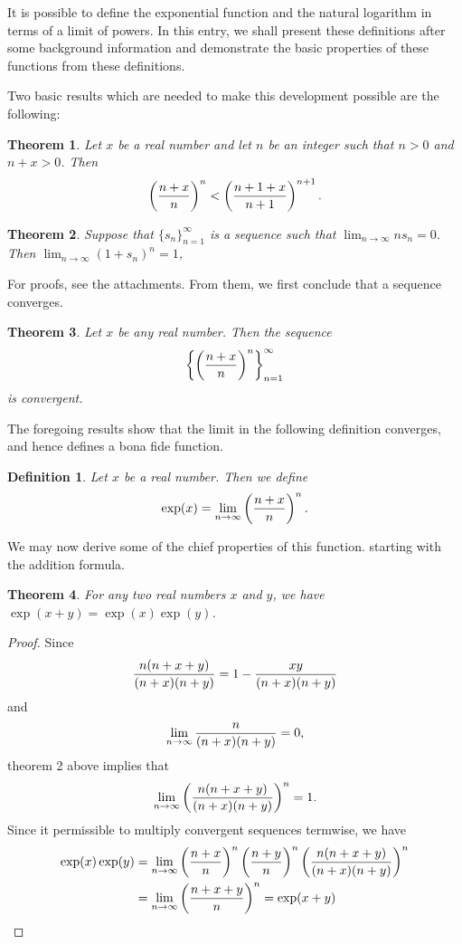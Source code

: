 \documentclass[12pt]{article}
\newtheorem{dfn}{Definition}
\newtheorem{thm}{Theorem}
\begin{document}
It is possible to define the exponential function and the natural logarithm 
in terms of a limit of powers.  In this entry, we shall present these
definitions after some background information and demonstrate the basic
properties of these functions from these definitions.

Two basic results which are needed to make this development possible
are the following:

\begin{thm}
Let $x$ be a real number and let $n$ be an integer such that
$n > 0$ and $n + x > 0$.  Then
\[
\left( {n + x \over n} \right)^n < 
\left( {n + 1 + x \over n + 1} \right)^{n+1}.
\]
\end{thm}

\begin{thm}
Suppose that $\{s_n\}_{n=1}^\infty$ is a sequence such that
$\lim_{n \to \infty} n s_n = 0$.  Then $\lim_{n \to \infty} 
(1 + s_n)^n = 1$,
\end{thm}

For proofs, see the attachments.  From them, we first conclude
that a sequence converges.

\begin{thm}
Let $x$ be any real number.  Then the sequence
\[
\left\{ \left( {n + x \over n} \right)^n \right\}_{n=1}^\infty
\]
is convergent.
\end{thm}

The foregoing results show that the limit in the following
definition converges, and hence defines a bona fide function.

\begin{dfn}
Let $x$ be a real number.  Then we define
\[
\exp (x) = \lim_{n \to \infty}
\left( {n + x \over n} \right)^n .
\]
\end{dfn}

We may now derive some of the chief properties of this function.
starting with the addition formula.

\begin{thm}
For any two real numbers $x$ and $y$, we have $\exp (x+y) = \exp(x) \exp (y)$.
\end{thm}

\begin{proof}
Since
\[
 {n (n + x + y) \over (n + x) (n + y)} =
 1 - {xy \over (n + x) (n + y)}
\]
and
\[
 \lim_{n \to \infty} {n \over (n + x) (n + y)} = 0 ,
\]
theorem 2 above implies that
\[
 \lim_{n \to \infty}
 \left(
  {n (n + x + y) \over (n + x) (n + y)}
 \right)^n = 1 .
\]
Since it permissible to multiply convergent sequences termwise, we have
\begin{align*}
 \exp (x) \exp (y) &=
 \lim_{n \to \infty} \left( {n + x \over n} \right)^n
                     \left( {n + y \over n} \right)^n
                     \left(
                      {n (n + x + y) \over (n + x) (n + y)}
                     \right)^n \\ &=
 \lim_{n \to \infty} \left( {n + x + y \over n} \right)^n = 
 \exp (x+y)
\end{align*}
\end{proof}
\end{document}
